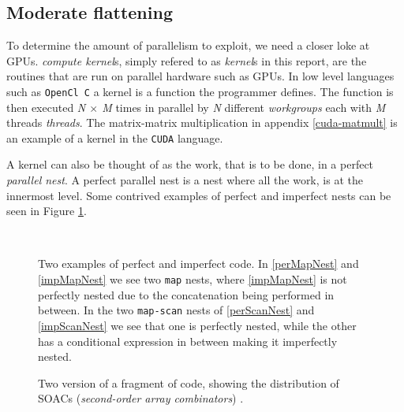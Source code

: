 \subsection{Moderate flattening}
To determine the amount of parallelism to exploit, we need a closer loke at
GPUs. \textit{compute kernel}s, simply refered to as \textit{kernel}s in this
report, are the routines that are run on parallel hardware such as GPUs.  In 
low level languages such as \texttt{OpenCl C} a kernel is a function the
programmer defines. The function is then executed \textit{N $\times$ M} times 
in parallel by
\textit{N} different \textit{workgroups} each with \textit{M} threads 
\textit{threads}.
The matrix-matrix multiplication in appendix \ref{cuda-matmult} is an example
of a kernel in the \texttt{CUDA} language.

A kernel can also be thought of as the work, that is to be done, in a perfect
\textit{parallel nest}. A perfect parallel nest is a nest where all the work,
is at the innermost level. Some contrived examples of perfect and imperfect
nests can be seen in Figure \ref{nests}.

\begin{figure}[h]
  \centering
  \hspace{2cm}
  \\
  \hspace{2cm}
  \caption{Two examples of perfect and imperfect code. In \ref{perMapNest} and 
  \ref{impMapNest} we see two \texttt{map} nests, where \ref{impMapNest} is not 
perfectly nested due to the concatenation being performed in between. In the 
two \texttt{map-scan} nests of \ref{perScanNest} and \ref{impScanNest} we see 
that one is perfectly nested, while the other has a conditional expression in 
between making it imperfectly nested.}
  \label{nests}
\end{figure}
\begin{figure}[H]
\centering
  \hspace{2cm}
  \caption{Two version of a fragment of code, showing the distribution of SOACs 
  (\textit{second-order array combinators}) \cite{futhark-moderate-blog}.}
  \label{loopDist}
\end{figure}


